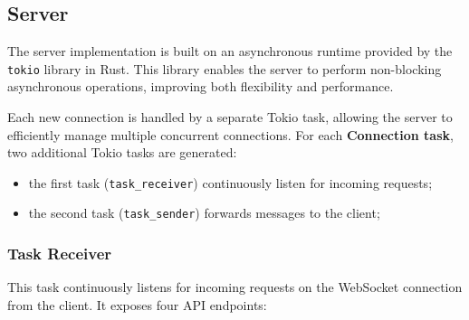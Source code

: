 \subsection{Server}
\label{subsec:Server}
The server implementation is built on an asynchronous runtime provided by the \texttt{tokio} library in Rust. This library enables the server to perform non-blocking asynchronous operations, improving both flexibility and performance.  

Each new connection is handled by a separate Tokio task, allowing the server to efficiently manage multiple concurrent connections. For each \textbf{Connection task}, two additional Tokio tasks are generated:

\begin{itemize}
    \item the first task (\texttt{task\_receiver}) continuously listen for incoming requests;
    \item the second task (\texttt{task\_sender}) forwards messages to the client;
\end{itemize}

\subsubsection{Task Receiver}
\label{subsec:TaskReceiver}

This task continuously listens for incoming requests on the WebSocket connection from the client. It exposes four API endpoints:

